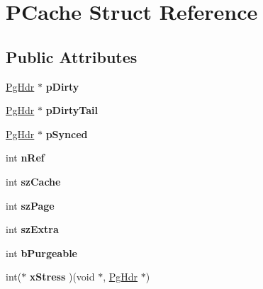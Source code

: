 \hypertarget{struct_p_cache}{\section{P\-Cache Struct Reference}
\label{struct_p_cache}
}
\subsection*{Public Attributes}
\begin{DoxyCompactItemize}
\item 
\hypertarget{struct_p_cache_a1c692ce92c7d3fc7c6c1324d5658b252}{\hyperlink{struct_pg_hdr}{Pg\-Hdr} $\ast$ {\bfseries p\-Dirty}}\label{struct_p_cache_a1c692ce92c7d3fc7c6c1324d5658b252}

\item 
\hypertarget{struct_p_cache_a8eaca309bfb8fa49e7c5e77dd3398bb0}{\hyperlink{struct_pg_hdr}{Pg\-Hdr} $\ast$ {\bfseries p\-Dirty\-Tail}}\label{struct_p_cache_a8eaca309bfb8fa49e7c5e77dd3398bb0}

\item 
\hypertarget{struct_p_cache_a607eabd6768dd8df47d8fa353542b106}{\hyperlink{struct_pg_hdr}{Pg\-Hdr} $\ast$ {\bfseries p\-Synced}}\label{struct_p_cache_a607eabd6768dd8df47d8fa353542b106}

\item 
\hypertarget{struct_p_cache_a8270710a90112645a69cea03ab5a2d25}{int {\bfseries n\-Ref}}\label{struct_p_cache_a8270710a90112645a69cea03ab5a2d25}

\item 
\hypertarget{struct_p_cache_a93ed4b9d731d883c3ed22a5adfd9c636}{int {\bfseries sz\-Cache}}\label{struct_p_cache_a93ed4b9d731d883c3ed22a5adfd9c636}

\item 
\hypertarget{struct_p_cache_abb0bd0a3292780dcc07cb59bc577990d}{int {\bfseries sz\-Page}}\label{struct_p_cache_abb0bd0a3292780dcc07cb59bc577990d}

\item 
\hypertarget{struct_p_cache_abcb37fcd3ea098b98a196a3f69e3c135}{int {\bfseries sz\-Extra}}\label{struct_p_cache_abcb37fcd3ea098b98a196a3f69e3c135}

\item 
\hypertarget{struct_p_cache_a6dbb1820ecbfb378841ee81186ea5902}{int {\bfseries b\-Purgeable}}\label{struct_p_cache_a6dbb1820ecbfb378841ee81186ea5902}

\item 
\hypertarget{struct_p_cache_a8b177ebb03aaf4774b6137d48733eeb5}{int($\ast$ {\bfseries x\-Stress} )(void $\ast$, \hyperlink{struct_pg_hdr}{Pg\-Hdr} $\ast$)}\label{struct_p_cache_a8b177ebb03aaf4774b6137d48733eeb5}


\end{DoxyCompactItemize}
